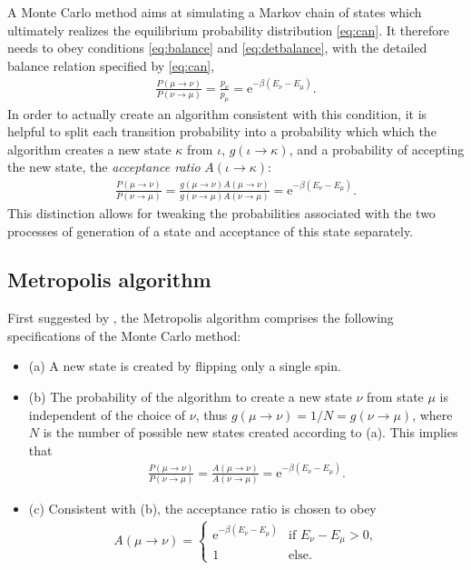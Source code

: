 \documentclass[fleqn]{scrartcl}
\newcommand{\eul}{\mathrm{e}}
\newenvironment{denseitem}{
  \begin{itemize}
    \setlength{\itemsep}{0pt}
    \setlength{\parskip}{0pt}
    \setlength{\parsep}{0pt}
}{
  \end{itemize}
}
\begin{document}
A Monte Carlo method aims at simulating a Markov chain of states which ultimately realizes the equilibrium probability distribution \eqref{eq:can}.
It therefore needs to obey conditions \eqref{eq:balance} and \eqref{eq:detbalance}, with the detailed balance relation specified by \eqref{eq:can},
%
\begin{align*}
  \frac{P(\mu \rightarrow \nu)}{P(\nu \rightarrow \mu)} = \frac{p_\nu}{p_\mu} = \eul^{-\beta (E_\nu - E_\mu)}.
\end{align*}
%
In order to actually create an algorithm consistent with this condition, it is helpful to split each transition probability into a probability which which the algorithm creates a new state $\kappa$ from $\iota$, $g(\iota \rightarrow \kappa)$, and a probability of accepting the new state, the \textsl{acceptance ratio} $A(\iota \rightarrow \kappa)$:
%
\begin{align*}
  \frac{P(\mu \rightarrow \nu)}{P(\nu \rightarrow \mu)} = \frac{g(\mu \rightarrow \nu) A(\mu \rightarrow \nu)}{g(\nu \rightarrow \mu) A(\nu \rightarrow \mu)} = \eul^{-\beta (E_\nu - E_\mu)}.
\end{align*}
%
This distinction allows for tweaking the probabilities associated with the two processes of generation of a state and acceptance of this state separately.


\subsection{Metropolis algorithm}

First suggested by \cite{metropolis53}, the Metropolis algorithm comprises the following specifications of the Monte Carlo method:
%
\begin{denseitem}
  \item[(a)] A new state is created by flipping only a single spin.
  \item[(b)] The probability of the algorithm to create a new state $\nu$ from state $\mu$ is independent of the choice of $\nu$, thus $g(\mu \rightarrow \nu) = 1/N = g(\nu \rightarrow \mu)$, where $N$ is the number of possible new states created according to (a). This implies that
    \begin{align*}
      \frac{P(\mu \rightarrow \nu)}{P(\nu \rightarrow \mu)} = \frac{A(\mu \rightarrow \nu)}{A(\nu \rightarrow \mu)} = \eul^{-\beta (E_\nu - E_\mu)}.
    \end{align*}
  \item[(c)] Consistent with (b), the acceptance ratio is chosen to obey
    \begin{align*}
      A(\mu \rightarrow \nu) = \begin{cases} \eul^{-\beta (E_\nu - E_\mu)} & \mbox{if } E_\nu - E_\mu > 0, \\ 1 & \mbox{else}.\end{cases}
    \end{align*}
\end{denseitem}
\end{document}
